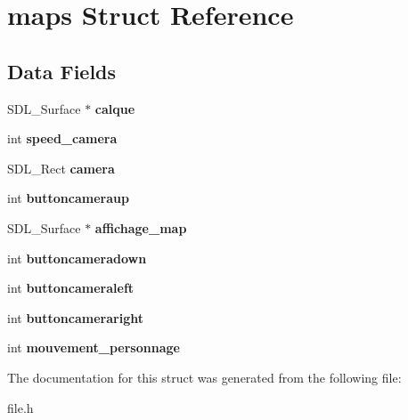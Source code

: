 \hypertarget{structmaps}{}\section{maps Struct Reference}
\label{structmaps}
\subsection*{Data Fields}
\begin{DoxyCompactItemize}
\item 
\mbox{\label{structmaps_aa31ebc131e955a0f360296f2511a3468}} 
S\+D\+L\+\_\+\+Surface $\ast$ {\bfseries calque}
\item 
\mbox{\label{structmaps_ab0ccde61b380fa3e3b50cfb958fa91de}} 
int {\bfseries speed\+\_\+camera}
\item 
\mbox{\label{structmaps_aab82595723041ff5880fe1605114c08a}} 
S\+D\+L\+\_\+\+Rect {\bfseries camera}
\item 
\mbox{\label{structmaps_adff29539db744060487f28ecf3850d00}} 
int {\bfseries buttoncameraup}
\item 
\mbox{\label{structmaps_abdef6a37c6ff8d4a841f11efec2f2647}} 
S\+D\+L\+\_\+\+Surface $\ast$ {\bfseries affichage\+\_\+map}
\item 
\mbox{\label{structmaps_aea036e289f40fb2cc9e0bb056f69c5c0}} 
int {\bfseries buttoncameradown}
\item 
\mbox{\label{structmaps_a089f5cea857fd901dd65cf22220e7b63}} 
int {\bfseries buttoncameraleft}
\item 
\mbox{\label{structmaps_a4e4413e1874bcb7016bfce67b1d5c5d1}} 
int {\bfseries buttoncameraright}
\item 
\mbox{\label{structmaps_a1c18ff7d5d473eca1368b1cabc746562}} 
int {\bfseries mouvement\+\_\+personnage}
\end{DoxyCompactItemize}


The documentation for this struct was generated from the following file\+:\begin{DoxyCompactItemize}
\item 
file.\+h\end{DoxyCompactItemize}
